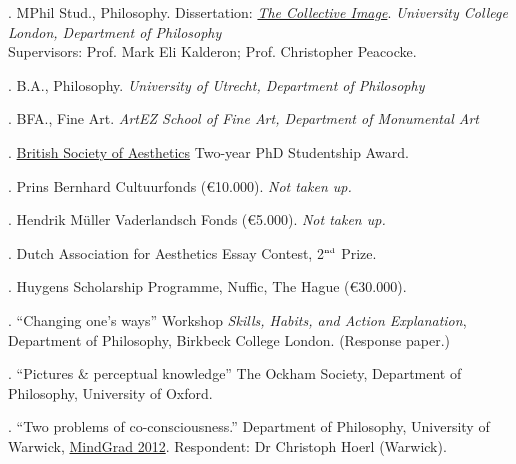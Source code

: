 \documentclass[11pt]{article}
\begin{document}

. MPhil Stud., Philosophy. Dissertation: \href{http://discovery.ucl.ac.uk/1348204/}{\emph{The Collective Image}}. \emph{University College London, Department of  Philosophy \vspace{0.01in}}\\ Supervisors: Prof. Mark Eli Kalderon; Prof. Christopher Peacocke. \vspace{-0.1in}

\bigskip



. B.A., Philosophy. \emph{University of Utrecht, Department of  Philosophy\vspace{0.02in}}

\medskip

. BFA., Fine Art. \emph{ArtEZ School of Fine Art, Department of Monumental Art\vspace{0.02in}}

\bigskip

\medskip

. \href{http://www.british-aesthetics.org}{British Society of Aesthetics} Two-year PhD Studentship Award. %

. Prins Bernhard Cultuurfonds (€10.000). \emph{Not taken up.}

. Hendrik Müller Vaderlandsch Fonds (€5.000). \emph{Not taken up.} 

. Dutch Association for Aesthetics Essay Contest, 2$^{\textrm{\tiny{nd}}}$ Prize.

. Huygens Scholarship Programme, Nuffic, The Hague (€30.000).

\bigskip 



\medskip
{}. ``Changing one's ways'' Workshop \emph{Skills, Habits, and Action Explanation}, Department of Philosophy, Birkbeck College London. (Response paper.)

. ``Pictures \& perceptual knowledge'' The Ockham Society, Department of Philosophy, University of Oxford.

. ``Two problems of co-consciousness.'' Department of Philosophy, University of Warwick, \href{http://www2.warwick.ac.uk/fac/soc/philosophy/news/conferences/mindgrad-2012/}{MindGrad 2012}. Respondent: Dr Christoph Hoerl (Warwick).
\end{document}
